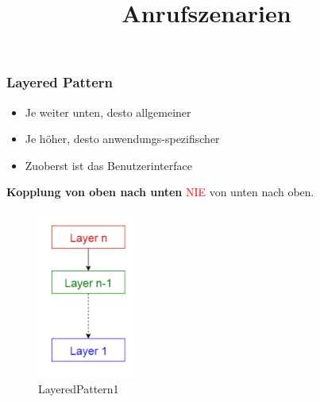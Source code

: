 \documentclass{article}
\begin{document}
\subsubsection{Layered Pattern}
\begin{multicols}{2}
\begin{itemize}
	\item Je weiter unten, desto allgemeiner
	\item Je höher, desto anwendungs-spezifischer
	\item Zuoberst ist das Benutzerinterface
\end{itemize}

\textbf{Kopplung von oben nach unten} \textcolor {red} {NIE} von unten nach oben.

\columnbreak

\begin{figure}[H]			\includegraphics[width=0.3\textwidth] {Resources/Images/LayeredPattern1.png}
\caption{\label{fig:LayeredPattern1}LayeredPattern1}
\end{figure}

\end{multicols}

\pagebreak

\title{Anrufszenarien}
\end{document}
